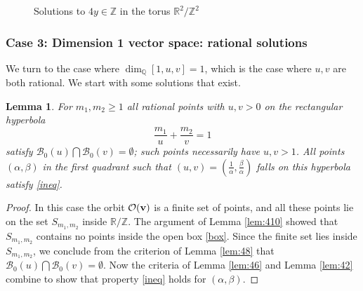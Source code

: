 \documentclass[12pt,letterpaper, reqno]{amsart}
\newtheorem{lem}[thm]{Lemma}
\theoremstyle{definition}
\theoremstyle{remark}
\newcommand{\RR}{\ensuremath{\mathbb{R}}}
\newcommand{\ZZ}{\ensuremath{\mathbb{Z}}}
\newcommand{\QQ}{\mathbb{Q}}
\newcommand{\sB}{{\mathcal B}}
\newcommand{\bv}{{\bf v}}
\newcommand{\sO}{{\mathcal O}}
\begin{document}
\begin{figure}[h]
\begin{center}
\end{center}
\caption{Solutions to $4y\in\ZZ$ in the torus $\RR^2/\ZZ^2$}
\end{figure} \label{fig_torus4}

\subsubsection{Case 3: Dimension 1 vector space: rational solutions }\label{sec:443}


We turn to the case  where $\dim_{\QQ} [1, u, v] =1$,
which is the case where $u, v$ are both  rational.
We start with some solutions that exist.

\begin{lem}\label{lem:413}
 For $m_1, m_2 \ge 1$ all  rational points with $u, v >0$ on the rectangular hyperbola
 $$
 \frac{m_1}{u} + \frac{m_2}{v} =1
 $$
satisfy $\sB_0(u) \bigcap \sB_0(v) = \emptyset$; such points necessarily have $u, v >1$.
All points $(\alpha, \beta)$  in the first quadrant 
such that  $(u, v) = (\frac{1}{\alpha}, \frac{\beta}{\alpha})$ 
falls  on this hyperbola satisfy \eqref{ineq}.
\end{lem}

\begin{proof}
In this case the orbit $\sO(\bv)$ is a finite set of points, and all
these points lie on the set  $S_{m_1, m_2}$ inside $\RR/\ZZ$.
The argument of Lemma \ref{lem:410} showed that $S_{m_1, m_2}$
contains no points inside the open box \eqref{box}. Since the finite set
lies inside $S_{m_1, m_2}$, we conclude from 
the criterion of Lemma \ref{lem:48} that $\sB_0(u) \bigcap \sB_0(v) = \emptyset.$
Now the criteria of Lemma \ref{lem:46} and Lemma \ref{lem:42} combine 
to show that property \eqref{ineq} holds for $(\alpha, \beta)$. 
\end{proof}
\end{document}
